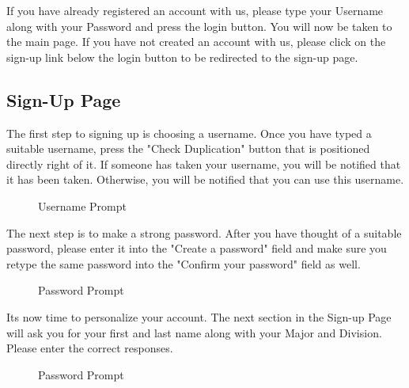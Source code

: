 \documentclass[10pt]{article}
\newcommand{\fancysub}[2] {{\color{primary}\subsection{#1} \label{sec:#2}}}
\begin{document}
			If you have already registered an account with us, please type your Username along with your Password and press the login button. You will now be taken to the main page. If you have not created an account with us, please click on the sign-up link below the login button to be redirected to the sign-up page. 
		
		\clearpage
		\fancysub{Sign-Up Page}{signup}
			The first step to signing up is choosing a username. Once you have typed a suitable username, press the "Check Duplication" button that is positioned directly right of it. If someone has taken your username, you will be notified that it has been taken. Otherwise, you will be notified that you can use this username.
			
			\begin{figure}[H]
				\centering
				\caption{Username Prompt}
				\label{fig:awesome_image}
			\end{figure}			
			
			The next step is to make a strong password. After you have thought of a suitable password, please enter it into the "Create a password" field and make sure you retype the same password into the "Confirm your password" field as well.
			
			\begin{figure}[H]
				\centering
				\caption{Password Prompt}
				\label{fig:awesome_image}
			\end{figure}		
			
			Its now time to personalize your account. The next section in the Sign-up Page will ask you for your first and last name along with your Major and Division. Please enter the correct responses.

			\begin{figure}[H]
				\centering
				\caption{Password Prompt}
				\label{fig:awesome_image}
			\end{figure}	
			
\end{document}

